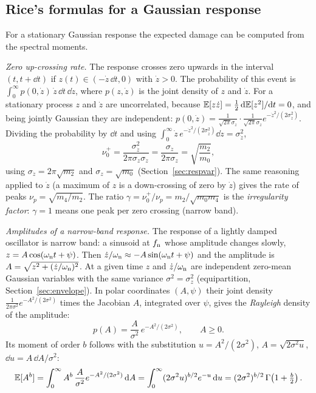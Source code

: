 \subsection{Rice's formulas for a Gaussian response}\label{sec:rice}

For a stationary Gaussian response the expected damage can be computed from the spectral moments.

\emph{Zero up-crossing rate.} The response crosses zero upwards in the interval $(t,t+\dd t)$ if
$z(t)\in(-\dot z\,\dd t, 0)$ with $\dot z>0$. The probability of this event is $\int_0^\infty
p(0,\dot z)\,\dot z\,\dd t\,\dd\dot z$, where $p(z,\dot z)$ is the joint density of $z$ and $\dot z$.
For a stationary process $z$ and $\dot z$ are uncorrelated, because $\mathbb{E}[z\dot z] =
\tfrac12\,\mathrm{d}\mathbb{E}[z^2]/\mathrm{d} t = 0$, and being jointly Gaussian they are independent:
$p(0,\dot z) = \frac{1}{\sqrt{2\pi}\sigma_z}\cdot\frac{1}{\sqrt{2\pi}\sigma_{\dot z}}
e^{-\dot z^2/(2\sigma_{\dot z}^2)}$. Dividing the probability by $\dd t$ and using
$\int_0^\infty \dot z\,e^{-\dot z^2/(2\sigma_{\dot z}^2)}\dd\dot z = \sigma_{\dot z}^2$,
\begin{equation}\label{eq:nu0}
  \nu_0^+ = \frac{\sigma_{\dot z}^2}{2\pi\sigma_z\sigma_{\dot z}} = \frac{\sigma_{\dot z}}{2\pi\sigma_z}
  = \sqrt{\frac{m_2}{m_0}} ,
\end{equation}
using $\sigma_{\dot z} = 2\pi\sqrt{m_2}$ and $\sigma_z = \sqrt{m_0}$ (Section~\ref{sec:respvar}).
The same reasoning applied to $\dot z$ (a maximum of $z$ is a down-crossing of zero by $\dot z$) gives
the rate of peaks $\nu_p = \sqrt{m_4/m_2}$. The ratio $\gamma = \nu_0^+/\nu_p = m_2/\sqrt{m_0m_4}$ is
the \emph{irregularity factor}: $\gamma=1$ means one peak per zero crossing (narrow band).

\emph{Amplitudes of a narrow-band response.}\label{sec:rayleigh} The response of a lightly damped
oscillator is narrow band: a sinusoid at $f_{\mathrm{n}}$ whose amplitude changes slowly,
$z = A\cos(\omega_{\mathrm{n}} t+\psi)$. Then $\dot z/\omega_{\mathrm{n}} \approx -A\sin(\omega_{\mathrm{n}} t+\psi)$ and the amplitude is
$A = \sqrt{z^2+(\dot z/\omega_{\mathrm{n}})^2}$. At a given time $z$ and $\dot z/\omega_{\mathrm{n}}$ are independent zero-mean
Gaussian variables with the same variance $\sigma^2 = \sigma_z^2$ (equipartition,
Section~\ref{sec:envelope}). In polar coordinates $(A,\psi)$ their joint density
$\frac{1}{2\pi\sigma^2}e^{-A^2/(2\sigma^2)}$ times the Jacobian $A$, integrated over $\psi$, gives the
\emph{Rayleigh} density of the amplitude:
\begin{equation}
  p(A) = \frac{A}{\sigma^2}\,e^{-A^2/(2\sigma^2)},\qquad A\ge0 .
\end{equation}
Its moment of order $b$ follows with the substitution $u = A^2/(2\sigma^2)$, $A = \sqrt{2\sigma^2u}$,
$\dd u = A\,\dd A/\sigma^2$:
\begin{equation}\label{eq:rayleighmoment}
  \mathbb{E}[A^b] = \int_0^\infty A^b\,\frac{A}{\sigma^2}e^{-A^2/(2\sigma^2)}\,\mathrm{d} A
  = \int_0^\infty (2\sigma^2u)^{b/2}e^{-u}\,\mathrm{d} u = (2\sigma^2)^{b/2}\,\Gamma\!\left(1+\tfrac b2\right).
\end{equation}

